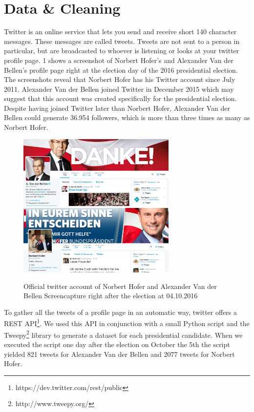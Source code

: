 \documentclass{llncs}
\begin{document}
\section{Data \& Cleaning}
Twitter is an online service that lets you send and receive short 140 character messages. These messages are called tweets. Tweets are not sent to a person in particular, but are broadcasted to whoever is listening or looks at your twitter profile page. \figurename{1} shows a screenshot of Norbert Hofer's and Alexander Van der Bellen's profile page right at the election day of the 2016 presidential election. The screenshots reveal that Norbert Hofer has his Twitter account since July 2011. Alexander Van der Bellen joined Twitter in December 2015 which may suggest that this account was created specifically for the presidential election. Despite having joined Twitter later than Norbert Hofer, Alexander Van der Bellen could generate 36.954 followers, which is more than three times as many as Norbert Hofer.
\begin{figure}[htbp] 
	\centering
	\includegraphics[width=0.7\textwidth]{grafics/vanderbellen_twitter.png}
	\includegraphics[width=0.7\textwidth]{grafics/hofer_twitter.png} %
	\caption{Official twitter account of Norbert Hofer and Alexander Van der Bellen Screencapture right after the election at 04.10.2016}
	\label{fig:Bild1}
\end{figure}

To gather all the tweets of a profile page in an automatic way, twitter offers a REST API\footnote{https://dev.twitter.com/rest/public}. We used this API in conjunction with a small Python script and the Tweepy\footnote{http://www.tweepy.org/} library to generate a dataset for each presidential candidate. When we executed the script one day after the election on October the 5th the script yielded 821 tweets for Alexander Van der Bellen and 2077 tweets for Norbert Hofer.
\end{document}
